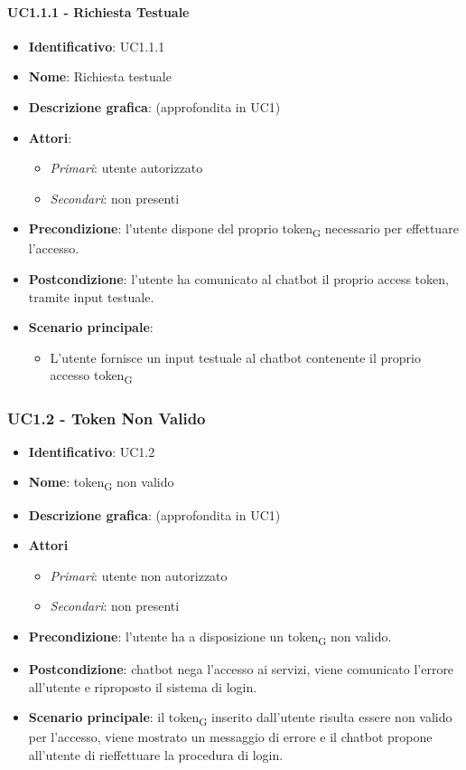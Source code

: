 \paragraph{UC1.1.1 - Richiesta Testuale}
\begin{itemize}
   \item \textbf{Identificativo}: UC1.1.1
   \item \textbf{Nome}: Richiesta testuale
   \item \textbf{Descrizione grafica}: (approfondita in UC1)
   \item \textbf{Attori}:
   \begin{itemize} 
       \item \textit{Primari}: utente autorizzato
       \item \textit{Secondari}: non presenti
   \end{itemize}
       \item \textbf{Precondizione}: l'utente dispone del proprio token\textsubscript{G} necessario per effettuare l'accesso.
       \item \textbf{Postcondizione}: l'utente ha comunicato al chatbot il proprio access token, tramite input testuale. 
    \item \textbf{Scenario principale}: 
       \begin{itemize}
           \item L'utente fornisce un input testuale al chatbot contenente il proprio accesso token\textsubscript{G} 
       \end{itemize}
\end{itemize}

\subsubsection{UC1.2 - Token Non Valido}
\begin{itemize}
    \item \textbf{Identificativo}: UC1.2
    \item \textbf{Nome}: token\textsubscript{G} non valido
    \item \textbf{Descrizione grafica}: (approfondita in UC1)
    \item \textbf{Attori}
 \begin{itemize} 
    \item \textit{Primari}: utente non autorizzato 
    \item \textit{Secondari}: non presenti
 \end{itemize}
 \item \textbf{Precondizione}: l'utente ha a disposizione un token\textsubscript{G} non valido.
 \item \textbf{Postcondizione}: chatbot nega l'accesso ai servizi, viene comunicato l'errore all'utente e riproposto il sistema di login.
 \item \textbf{Scenario principale}: il token\textsubscript{G} inserito dall'utente risulta essere non valido per l'accesso, viene mostrato un messaggio di errore e il chatbot propone all'utente di rieffettuare la procedura di login.
\end{itemize}
\newpage
